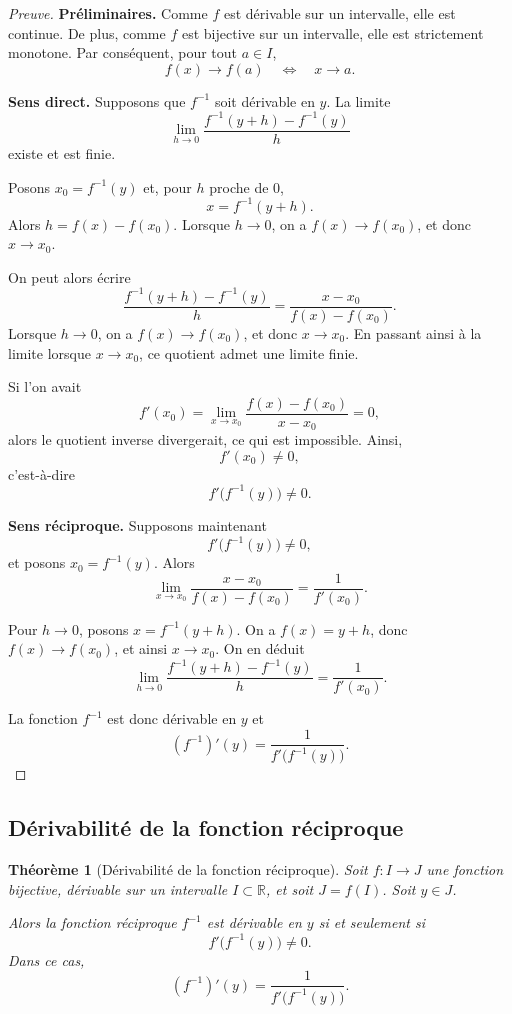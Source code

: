 \documentclass{report} %
\theoremstyle{definition}  %
\theoremstyle{plain} %
\newtheorem{theorem}{Théorème}[chapter]
\theoremstyle{remark} %
\begin{document}
\medskip

\begin{proof}[Preuve]
\textbf{Préliminaires.}
Comme \( f \) est dérivable sur un intervalle, elle est continue.
De plus, comme \( f \) est bijective sur un intervalle, elle est strictement monotone.
Par conséquent, pour tout \( a \in I \),
\[
f(x) \to f(a) \quad \Longleftrightarrow \quad x \to a.
\]

\medskip
\textbf{Sens direct.}
Supposons que \( f^{-1} \) soit dérivable en \( y \).
La limite
\[
\lim_{h \to 0} \frac{f^{-1}(y+h) - f^{-1}(y)}{h}
\]
existe et est finie.

Posons \( x_0 = f^{-1}(y) \) et, pour \( h \) proche de \(0\),
\[
x = f^{-1}(y+h).
\]
Alors \( h = f(x) - f(x_0) \).
Lorsque \( h \to 0 \), on a \( f(x) \to f(x_0) \), et donc \( x \to x_0 \).

On peut alors écrire
\[
\frac{f^{-1}(y+h) - f^{-1}(y)}{h}
=
\frac{x - x_0}{f(x) - f(x_0)}.
\]
Lorsque \( h \to 0 \), on a \( f(x) \to f(x_0) \), et donc \( x \to x_0 \).
En passant ainsi à la limite lorsque \( x \to x_0 \), ce quotient admet une limite finie.


Si l’on avait
\[
f'(x_0) = \lim_{x \to x_0} \frac{f(x) - f(x_0)}{x - x_0} = 0,
\]
alors le quotient inverse divergerait, ce qui est impossible.
Ainsi,
\[
f'(x_0) \neq 0,
\]
c’est-à-dire
\[
f'\bigl(f^{-1}(y)\bigr) \neq 0.
\]

\medskip
\textbf{Sens réciproque.}
Supposons maintenant
\[
f'\bigl(f^{-1}(y)\bigr) \neq 0,
\]
et posons \( x_0 = f^{-1}(y) \).
Alors
\[
\lim_{x \to x_0} \frac{x - x_0}{f(x) - f(x_0)} = \frac{1}{f'(x_0)}.
\]

Pour \( h \to 0 \), posons \( x = f^{-1}(y+h) \).
On a \( f(x) = y+h \), donc \( f(x) \to f(x_0) \), et ainsi \( x \to x_0 \).
On en déduit
\[
\lim_{h \to 0} \frac{f^{-1}(y+h) - f^{-1}(y)}{h}
=
\frac{1}{f'(x_0)}.
\]

La fonction \( f^{-1} \) est donc dérivable en \( y \) et
\[
(f^{-1})'(y) = \frac{1}{f'\bigl(f^{-1}(y)\bigr)}.
\]
\end{proof}


\medskip

\subsection{Dérivabilité de la fonction réciproque}

\begin{theorem}[Dérivabilité de la fonction réciproque]
Soit \( f : I \to J \) une fonction bijective, dérivable sur un intervalle \( I \subset \mathbb{R} \), et soit \( J = f(I) \).
Soit \( y \in J \).

Alors la fonction réciproque \( f^{-1} \) est dérivable en \( y \) si et seulement si
\[
f'\bigl(f^{-1}(y)\bigr) \neq 0.
\]
Dans ce cas,
\[
(f^{-1})'(y) = \frac{1}{f'\bigl(f^{-1}(y)\bigr)}.
\]
\end{theorem}
\end{document}
